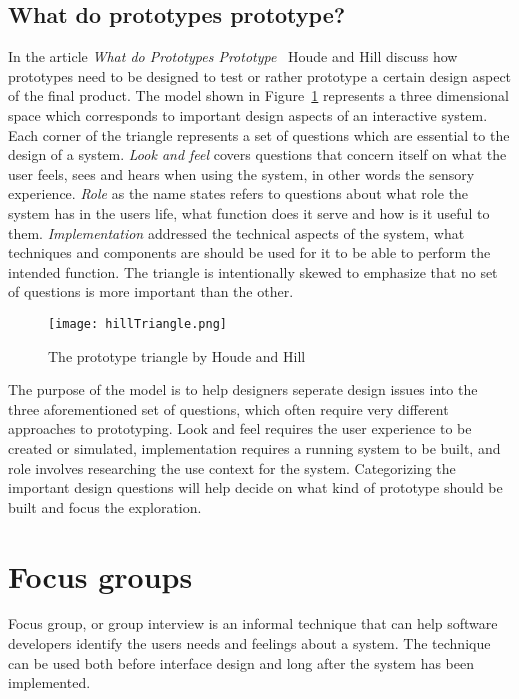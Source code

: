 \subsection{What do prototypes prototype?}
\label{sec:prototypesPrototype}
In the article \textit{What do Prototypes Prototype}~\cite{prototypesPrototype} Houde and Hill discuss how prototypes need to be designed to test or rather prototype a certain design aspect of the final product. The model shown in Figure~\ref{fig:hillTriangle} represents a three dimensional space which corresponds to important design aspects of an interactive system. Each corner of the triangle represents a set of questions which are essential to the design of a system. \textit{Look and feel} covers questions that concern itself on what the user feels, sees and hears when using the system, in other words the sensory experience. \textit{Role} as the name states refers to questions about what role the system has in the users life, what function does it serve and how is it useful to them. \textit{Implementation} addressed the technical aspects of the system, what techniques and components are should be used for it to be able to perform the intended function. The triangle is intentionally skewed to emphasize that no set of questions is more important than the other.

\begin{figure}[h!]
	\centering
		\texttt{[image: hillTriangle.png]}
		\caption{\footnotesize The prototype triangle by Houde and Hill~\cite{prototypesPrototype}}
		\label{fig:hillTriangle}
\end{figure}

The purpose of the model is to help designers seperate design issues into the three aforementioned set of questions, which often require very different approaches to prototyping. Look and feel requires the user experience to be created or simulated, implementation requires a running system to be built, and role involves researching the use context for the system. Categorizing the important design questions will help decide on what kind of prototype should be built and focus the exploration.

\section{Focus groups}
\label{sec:focusGroup}
Focus group, or group interview is an informal technique that can help software developers identify the users needs and feelings about a system. The technique can be used both before interface design and long after the system has been implemented. 

